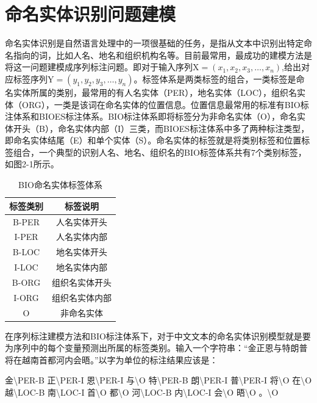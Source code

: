 \documentclass[winfonts,master,oneside,nobackinfo]{njuthesis}
\begin{document}
\section{命名实体识别问题建模}
命名实体识别是自然语言处理中的一项很基础的任务，是指从文本中识别出特定命名指向的词，比如人名、地名和组织机构名等。目前最常用，最成功的建模方法是将这一问题建模成序列标注问题。即对于输入序列$\mathrm { X } = \left( x _ { 1 } , x _ { 2 } , x _ { 3 } , \dots , x _ { n } \right)$,给出对应标签序列$\mathrm { Y } = \left( y _ { 1 } , y _ { 2 } , y _ { 3 } , \dots , y _ { n } \right)$。标签体系是两类标签的组合，一类标签是命名实体所属的类别，最常用的有人名实体（PER），地名实体（LOC），组织名实体（ORG），一类是该词在命名实体的位置信息。位置信息最常用的标准有BIO标注体系和BIOES标注体系。BIO标注体系即将标签分为非命名实体（O），命名实体开头（B），命名实体内部（I）三类，而BIOES标注体系中多了两种标注类型，即命名实体结尾（E）和单个实体（S）。命名实体的标签就是将类别标签和位置标签组合，一个典型的识别人名、地名、组织名的BIO标签体系共有7个类别标签，如图2-1所示。

\begin{table}[h]
\centering
\begin{tabular}{cc} %
\hline 
标签类别&标签说明\\
\hline  
B-PER&人名实体开头\\
I-PER&人名实体内部\\
B-LOC&地名实体开头\\
I-LOC&地名实体内部\\
B-ORG&组织名实体开头\\
I-ORG&组织名实体内部\\
O&非命名实体\\
\hline 
\end{tabular}
\caption{BIO命名实体标签体系}
\end{table}

在序列标注建模方法和BIO标注体系下，对于中文文本的命名实体识别模型就是要为序列中的每个变量预测出所属的标签类别。输入一个字符串：“金正恩与特朗普将在越南首都河内会晤。”以字为单位的标注结果应该是：

金\textbackslash PER-B 正\textbackslash PER-I 恩\textbackslash PER-I 与\textbackslash O 特\textbackslash PER-B 朗\textbackslash PER-I 普\textbackslash PER-I 将\textbackslash O 在\textbackslash O 越\textbackslash LOC-B 南\textbackslash LOC-I 首\textbackslash O 都\textbackslash O 河\textbackslash LOC-B 内\textbackslash LOC-I 会\textbackslash O 晤\textbackslash O 。\textbackslash O
\end{document}
